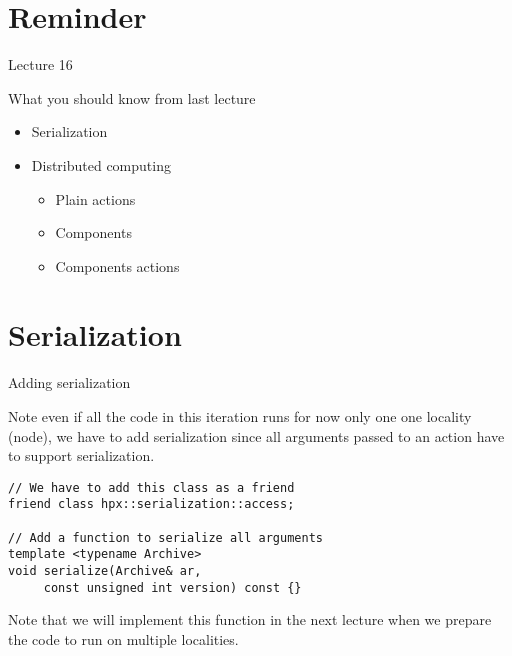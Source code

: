 \documentclass[12pt,t]{beamer}
\title{\coursename}
\subtitle{Lecture 17: Distributed implementation of the 1D heat equation}
\date {
 \tiny \url{\courseurl}
\vspace{2cm}
\doclicenseThis  
  
}
\begin{document}
 {
    \frame {
        \titlepage
    }
}

\frame{

\tableofcontents

}


\section{Reminder}
\begin{frame}{Lecture 16}
\begin{block}{What you should know from last lecture}
\begin{itemize}
\item Serialization
\item Distributed computing
\begin{itemize}
\item Plain actions
\item Components
\item Components actions
\end{itemize}
\end{itemize}
\end{block}
\end{frame}


\section{Serialization}

\begin{frame}[fragile]{Adding serialization}

Note even if all the code in this iteration runs for now only one one locality (node), we have to add serialization since all arguments passed to an action have to support serialization. 
\vspace{0.5cm}
\begin{lstlisting}
// We have to add this class as a friend
friend class hpx::serialization::access;

// Add a function to serialize all arguments
template <typename Archive>
void serialize(Archive& ar, 
     const unsigned int version) const {}
\end{lstlisting}

Note that we will implement this function in the next lecture when we prepare the code to run on multiple localities. 
\end{frame}
\end{document}
